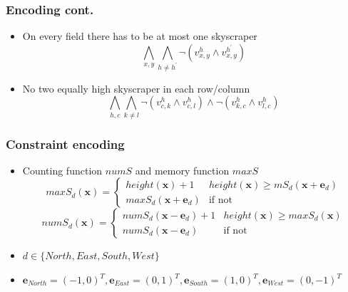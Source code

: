 \begin{frame}
	\frametitle{Encoding cont.}
	\begin{itemize}
		\item On every field there has to be at most one skyscraper
		\begin{displaymath}
			\bigwedge_{x,y} \bigwedge_{h\not=h^{\prime}} \neg(v_{x,y}^{h} \wedge v_{x,y}^{h^{\prime}})
		\end{displaymath}
		\item<2-> No two equally high skyscraper in each row/column
		\begin{displaymath}
			\bigwedge_{h,c} \bigwedge_{k\not=l} \neg(v_{c,k}^{h} \wedge v_{c,l}^{h}) \wedge \neg (v_{k,c}^{h} \wedge v_{l,c}^{h})
		\end{displaymath}
	\end{itemize}
\end{frame}

\begin{frame}
	\frametitle{Constraint encoding}
	\begin{itemize}
		\item Counting function $numS$ and memory function $maxS$
		\begin{displaymath}
			maxS_{d}(\pmb x) = 
			\begin{cases}
				height(\pmb x)+1 & height(\pmb x) \ge mS_{d}(\pmb x + \pmb e_{d})\\
				maxS_{d}(\pmb x + \pmb e_{d}) &\text{if not}
			\end{cases}
		\end{displaymath}
		\begin{displaymath}
			numS_{d}(\pmb x) =
			\begin{cases}
				numS_{d}(\pmb x - \pmb e_{d}) + 1 & height(\pmb x) \ge maxS_{d}(\pmb x)\\
				numS_{d}(\pmb x - \pmb e_{d}) &\text{if not}
			\end{cases}
		\end{displaymath}
		\item $d\in \{North, East, South, West\}$
		\item $\pmb e_{North} = (-1,0)^T, \pmb e_{East} = (0,1)^T, \pmb e_{South} = (1,0)^T,\pmb e_{West} = (0,-1)^T$
	\end{itemize}
\end{frame}

